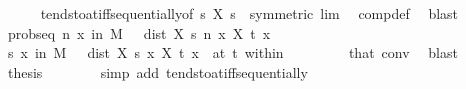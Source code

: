 \begin{isabellebody}
\ \ \ \ \isamarkupfalse%
\ tendsto{\isacharunderscore}{\kern0pt}at{\isacharunderscore}{\kern0pt}iff{\isacharunderscore}{\kern0pt}sequentially{\isacharbrackleft}{\kern0pt}of\ {\isachardoublequoteopen}{\isasymlambda}s{\isachardot}{\kern0pt}\ X\ s\ {\isasymomega}{\isachardoublequoteclose}{\isacharcomma}{\kern0pt}\ symmetric{\isacharbrackright}{\kern0pt}\ lim\ \isamarkupfalse%
\ comp{\isacharunderscore}{\kern0pt}def\ \isamarkupfalse%
\ blast\isanewline
\ \ \isamarkupfalse%
\ prob{\isacharunderscore}{\kern0pt}seq{\isacharcolon}{\kern0pt}\ {\isachardoublequoteopen}{\isacharparenleft}{\kern0pt}{\isasymlambda}n{\isachardot}{\kern0pt}\ {\isasymP}{\isacharparenleft}{\kern0pt}x\ in\ M{\isachardot}{\kern0pt}\ {\isasymepsilon}\ {\isacharless}{\kern0pt}\ dist\ {\isacharparenleft}{\kern0pt}X\ {\isacharparenleft}{\kern0pt}s\ n{\isacharparenright}{\kern0pt}\ x{\isacharparenright}{\kern0pt}\ {\isacharparenleft}{\kern0pt}X\ t\ x{\isacharparenright}{\kern0pt}{\isacharparenright}{\kern0pt}{\isacharparenright}{\kern0pt}\ {\isasymlonglonglongrightarrow}\ {}{\isachardoublequoteclose}\ \ {\isachardoublequoteopen}{\isasymepsilon}\ {\isachargreater}{\kern0pt}\ {}{\isachardoublequoteclose}\ \ {\isasymepsilon}\isanewline
\ \ \isamarkupfalse%
\ {\isacharminus}{\kern0pt}\isanewline
\ \ \ \ \isamarkupfalse%
\ {\isachardoublequoteopen}{\isacharparenleft}{\kern0pt}{\isacharparenleft}{\kern0pt}{\isasymlambda}s{\isachardot}{\kern0pt}\ {\isasymP}{\isacharparenleft}{\kern0pt}x\ in\ M{\isachardot}{\kern0pt}\ {\isasymepsilon}\ {\isacharless}{\kern0pt}\ dist\ {\isacharparenleft}{\kern0pt}X\ s\ x{\isacharparenright}{\kern0pt}\ {\isacharparenleft}{\kern0pt}X\ t\ x{\isacharparenright}{\kern0pt}{\isacharparenright}{\kern0pt}{\isacharparenright}{\kern0pt}\ {\isasymlonglongrightarrow}\ {}{\isacharparenright}{\kern0pt}{\isacharparenleft}{\kern0pt}at\ t\ within\ {\isacharbraceleft}{\kern0pt}{}{\isachardot}{\kern0pt}{\isachardot}{\kern0pt}{\isacharbraceright}{\kern0pt}{\isacharparenright}{\kern0pt}{\isachardoublequoteclose}\isanewline
\ \ \ \ \ \ \isamarkupfalse%
\ that\ conv\ \isamarkupfalse%
\ blast\isanewline
\ \ \ \ \isamarkupfalse%
\ \isamarkupfalse%
\ {\isacharquery}{\kern0pt}thesis\isanewline
\ \ \ \ \ \ \isamarkupfalse%
\ {\isacharparenleft}{\kern0pt}simp\ add{\isacharcolon}{\kern0pt}\ tendsto{\isacharunderscore}{\kern0pt}at{\isacharunderscore}{\kern0pt}iff{\isacharunderscore}{\kern0pt}sequentially{\isacharparenright}{\kern0pt}\isanewline

\end{isabellebody}
